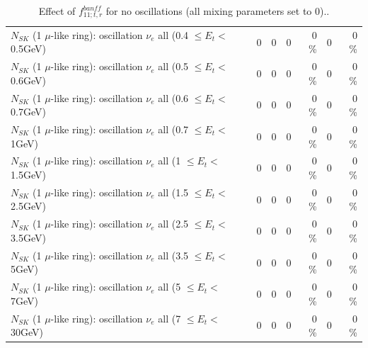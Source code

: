 \begin{table}
\begin{tabular}{| l | r | r | r  r | r  r |}
$N_{SK}$ (1 $\mu$-like ring): oscillation $\nu_{e}$ all (0.4 $\leq E_{t} <$ 0.5GeV) &               0 &               0 &               0 &        0 \%  &               0 &        0 \%  \\ 
$N_{SK}$ (1 $\mu$-like ring): oscillation $\nu_{e}$ all (0.5 $\leq E_{t} <$ 0.6GeV) &               0 &               0 &               0 &        0 \%  &               0 &        0 \%  \\ 
$N_{SK}$ (1 $\mu$-like ring): oscillation $\nu_{e}$ all (0.6 $\leq E_{t} <$ 0.7GeV) &               0 &               0 &               0 &        0 \%  &               0 &        0 \%  \\ 
$N_{SK}$ (1 $\mu$-like ring): oscillation $\nu_{e}$ all (0.7 $\leq E_{t} <$ 1GeV) &               0 &               0 &               0 &        0 \%  &               0 &        0 \%  \\ 
$N_{SK}$ (1 $\mu$-like ring): oscillation $\nu_{e}$ all (1 $\leq E_{t} <$ 1.5GeV) &               0 &               0 &               0 &        0 \%  &               0 &        0 \%  \\ 
$N_{SK}$ (1 $\mu$-like ring): oscillation $\nu_{e}$ all (1.5 $\leq E_{t} <$ 2.5GeV) &               0 &               0 &               0 &        0 \%  &               0 &        0 \%  \\ 
$N_{SK}$ (1 $\mu$-like ring): oscillation $\nu_{e}$ all (2.5 $\leq E_{t} <$ 3.5GeV) &               0 &               0 &               0 &        0 \%  &               0 &        0 \%  \\ 
$N_{SK}$ (1 $\mu$-like ring): oscillation $\nu_{e}$ all (3.5 $\leq E_{t} <$ 5GeV) &               0 &               0 &               0 &        0 \%  &               0 &        0 \%  \\ 
 $N_{SK}$ (1 $\mu$-like ring): oscillation $\nu_{e}$ all (5 $\leq E_{t} <$ 7GeV) &               0 &               0 &               0 &        0 \%  &               0 &        0 \%  \\ 
$N_{SK}$ (1 $\mu$-like ring): oscillation $\nu_{e}$ all (7 $\leq E_{t} <$ 30GeV) &               0 &               0 &               0 &        0 \%  &               0 &        0 \%  \\ 
\hline
\hline
\end{tabular}
\caption{ Effect of $f_{11; t, r}^{banff}$ for no oscillations (all mixing parameters set to 0).. }
\label{tab:num_banff_11_1RmuT_3f_osc_t13:0}
\end{table}
\clearpage
